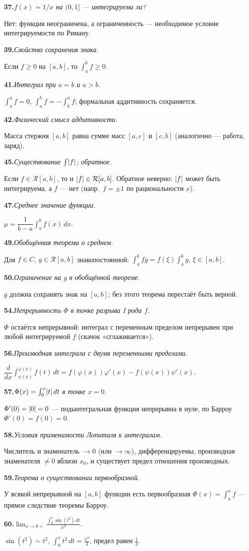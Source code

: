 \documentclass[10pt,a4paper]{article}
\newcommand{\dx}{\,dx}
\newcommand{\dt}{\,dt}
\renewcommand{\ge}{\geqslant}
\DeclarePairedDelimiter{\abs}{\lvert}{\rvert}
\theoremstyle{definition}
\theoremstyle{plain}
\newcommand{\writespace}{\vspace{7.5mm}}
\newcommand{\faq}[3]{%
  \par\smallskip\noindent
  \textbf{#1.}\enspace\textit{#2}\par
  \nobreak\vspace{0.3ex}\noindent #3\par
  \writespace}
\begin{document}
\faq{37}{$f(x)=1/x$ на $(0,1]$ — интегрируема ли?}{%
Нет: функция неограничена, а ограниченность — необходимое условие интегрируемости по Риману.}

\faq{39}{Свойство сохранения знака.}{%
Если $f\ge0$ на $[a,b]$, то $\int_a^b f\ge0$.}

\faq{41}{Интеграл при $a=b$ и $a>b$.}{%
$\int_a^a f=0$, $\int_a^b f=-\int_b^a f$; формальная аддитивность сохраняется.}

\faq{42}{Физический смысл аддитивности.}{%
Масса стержня $[a,b]$ равна сумме масс $[a,c]$ и $[c,b]$ (аналогично — работа, заряд).}

\faq{45}{Существование $\int\abs{f}$; обратное.}{%
Если $f\in\mathcal R[a,b]$, то и $\abs f\in\mathcal R[a,b]$. Обратное неверно: $\abs f$ может быть
интегрируема, а $f$ — нет (напр.\ $f=\pm1$ по рациональности $x$).}

\faq{47}{Среднее значение функции.}{%
$\mu=\dfrac1{b-a}\int_a^b f(x)\dx$.}

\faq{49}{Обобщённая теорема о среднем.}{%
Для $f\in C$, $g\in\mathcal R[a,b]$ знакопостоянной: $\int_a^b fg=f(\xi)\int_a^b g$, $\xi\in[a,b]$.}

\faq{50}{Ограничение на $g$ в обобщённой теореме.}{%
$g$ должна сохранять знак на $[a,b]$; без этого теорема перестаёт быть верной.}

\faq{54}{Непрерывность $\Phi$ в точке разрыва I рода $f$.}{%
$\Phi$ остаётся непрерывной: интеграл с переменным пределом непрерывен при любой интегрируемой
$f$ (скачок «сглаживается»).}

\faq{56}{Производная интеграла с двумя переменными пределами.}{%
$\dfrac{d}{dx}\int_{\psi(x)}^{\varphi(x)}f(t)\dt=f(\varphi(x))\varphi'(x)-f(\psi(x))\psi'(x)$.}

\faq{57}{$\Phi(x)=\int_0^x\abs t\dt$ в точке $x=0$.}{%
$\Phi'(0)=\abs0=0$ — подынтегральная функция непрерывна в нуле, по Барроу $\Phi'(0)=f(0)=0$.}

\faq{58}{Условия применимости Лопиталя к интегралам.}{%
Числитель и знаменатель $\to0$ (или $\to\infty$), дифференцируемы, производная знаменателя $\ne0$
вблизи $x_0$, и существует предел отношения производных.}

\faq{59}{Теорема о существовании первообразной.}{%
У всякой непрерывной на $[a,b]$ функции есть первообразная $\Phi(x)=\int_a^x f$ — прямое следствие
теоремы Барроу.}

\faq{60}{$\displaystyle\lim_{x\to0+}\frac{\int_0^x\sin(t^2)\dt}{x^3}$.}{%
$\sin(t^2)\sim t^2$, $\int_0^x t^2\dt=\tfrac{x^3}3$, предел равен $\tfrac13$.}
\end{document}
